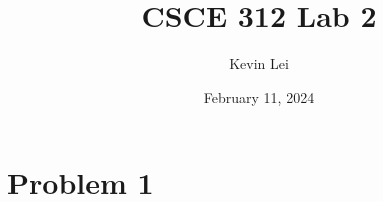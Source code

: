 \documentclass{article}
\title{CSCE 312 Lab 2}
\author{Kevin Lei}
\date{February 11, 2024}
\begin{document}
\maketitle

\section{Problem 1}
\end{document}
